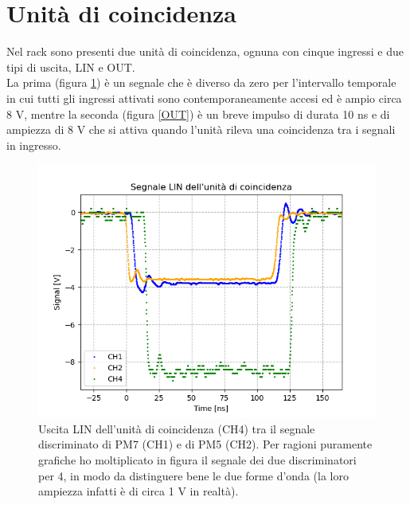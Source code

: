 \documentclass{article}
\begin{document}
\newpage
\section{Unità di coincidenza}
Nel rack sono presenti due unità di coincidenza, ognuna con cinque ingressi e due tipi di uscita, LIN e OUT. \\
La prima (figura \ref{LIN}) è un segnale che è diverso da zero per l'intervallo temporale in cui tutti gli ingressi attivati sono contemporaneamente accesi ed è ampio circa 8 V, mentre la seconda (figura \ref{OUT}) è un breve impulso di durata 10 ns e di ampiezza di 8 V che si attiva quando l'unità rileva una coincidenza tra i segnali in ingresso. 

\begin{figure}[h!]
\begin{center}
\includegraphics[scale=0.6]{Grafici/LIN_segnale.png}
\caption{Uscita LIN dell'unità di coincidenza (CH4) tra il segnale discriminato di PM7 (CH1) e di PM5 (CH2). Per ragioni puramente grafiche ho moltiplicato in figura il segnale dei due discriminatori per 4, in modo da distinguere bene le due forme d'onda (la loro ampiezza infatti è di circa 1 V in realtà).} \label{LIN}
\end{center}
\end{figure}
\end{document}
